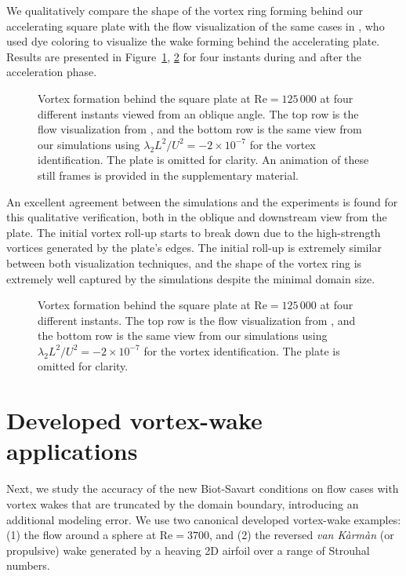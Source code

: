 \documentclass[final,1p,times]{elsarticle}
\begin{document}
We qualitatively compare the shape of the vortex ring forming behind our accelerating square plate with the flow visualization of the same cases in \cite{Higuchi1996Three-dimensionalPlates}, who used dye coloring to visualize the wake forming behind the accelerating plate. Results are presented in Figure~\ref{fig:square_disk_comparison_oblique}, \ref{fig:square_disk_comparison} for four instants during and after the acceleration phase. 

\begin{figure}
    \centering
    \def\svgwidth{1\columnwidth}
    
    \caption{Vortex formation behind the square plate at $\text{Re}=125\,000$ at four different instants viewed from an oblique angle. The top row is the flow visualization from \cite{Higuchi1996Three-dimensionalPlates}, and the bottom row is the same view from our simulations using $\lambda_2L^2/U^2=-2\times10^{-7}$ for the vortex identification. The plate is omitted for clarity. An animation of these still frames is provided in the supplementary material.}
    \label{fig:square_disk_comparison_oblique}
\end{figure}
An excellent agreement between the simulations and the experiments is found for this qualitative verification, both in the oblique and downstream view from the plate. The initial vortex roll-up starts to break down due to the high-strength vortices generated by the plate's edges. The initial roll-up is extremely similar between both visualization techniques, and the shape of the vortex ring is extremely well captured by the simulations despite the minimal domain size.
\begin{figure}
    \centering
    \def\svgwidth{1\columnwidth}
    
    \caption{Vortex formation behind the square plate at $\text{Re}=125\,000$ at four different instants. The top row is the flow visualization from \cite{Higuchi1996Three-dimensionalPlates}, and the bottom row is the same view from our simulations using $\lambda_2L^2/U^2=-2\times10^{-7}$ for the vortex identification. The plate is omitted for clarity.}
    \label{fig:square_disk_comparison}
\end{figure}

\section{Developed vortex-wake applications}

Next, we study the accuracy of the new Biot-Savart conditions on flow cases with vortex wakes that are truncated by the domain boundary, introducing an additional modeling error. We use two canonical developed vortex-wake examples: (1) the flow around a sphere at $\text{Re}=3700$, and (2) the reversed \emph{van K\`arm\`an} (or propulsive) wake generated by a heaving 2D airfoil over a range of Strouhal numbers.
\end{document}
